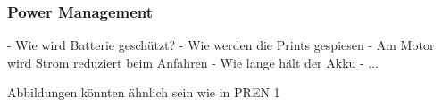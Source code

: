 \documentclass[main.tex]{subfiles} %
\begin{document}

\subsubsection{Power Management}

- Wie wird Batterie geschützt?
- Wie werden die Prints gespiesen
- Am Motor wird Strom reduziert beim Anfahren
- Wie lange hält der Akku
- ...

Abbildungen könnten ähnlich sein wie in PREN 1
\end{document}
